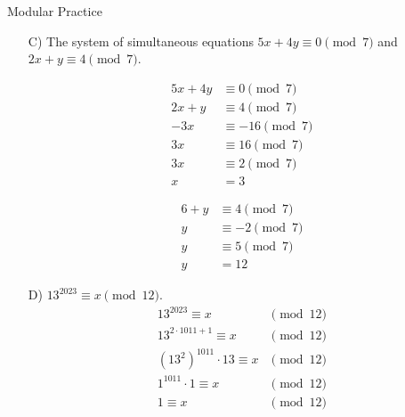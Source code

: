 \begin{homeworkProblem}{Modular Practice}
\begin{itemize}
        \item[C)] The system of simultaneous equations $5x+4y \equiv 0 \pmod{7}$ 
        and $2x+y \equiv 4 \pmod{7}$. 
        \begin{multicols}{2}
            \[
                \begin{split}
                    5x + 4y &\equiv 0 \pmod{7} \\
                    2x + y &\equiv 4 \pmod{7} \\
                    -3x &\equiv -16 \pmod{7} \\
                    3x &\equiv 16 \pmod{7} \\
                    3x &\equiv 2 \pmod{7} \\
                    x &= 3
                \end{split}
            \]

            \[
                \begin{split}
                    6 + y &\equiv 4 \pmod{7} \\
                    y &\equiv -2 \pmod{7} \\
                    y &\equiv 5 \pmod{7} \\
                    y &= 12
                \end{split}
            \]
        \end{multicols}

        \item[D)] $13^{2023} \equiv x \pmod{12}$.
        \[
            \begin{split}
                13^{2023} \equiv x & \pmod{12} \\
                13^{2 \cdot 1011 + 1} \equiv x & \pmod{12} \\ 
                (13^2)^{1011} \cdot 13 \equiv x & \pmod{12} \\
                1^{1011} \cdot 1 \equiv x & \pmod{12} \\
                1 \equiv x & \pmod{12}
            \end{split}
        \]


\end{itemize}
\end{homeworkProblem}
